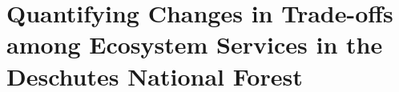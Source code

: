  
\chapter{Quantifying Changes in Trade-offs among Ecosystem Services in the Deschutes National Forest}




